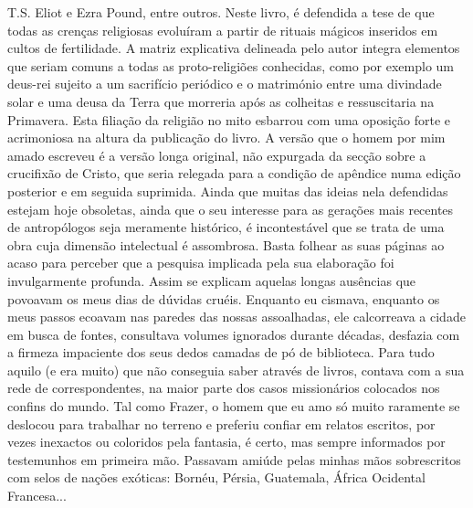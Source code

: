 T.S. Eliot e Ezra Pound, entre outros. Neste livro, é defendida a tese
de que todas as crenças religiosas evoluíram a partir de rituais mágicos
inseridos em cultos de fertilidade. A matriz explicativa delineada pelo
autor integra elementos que seriam comuns a todas as proto-religiões
conhecidas, como por exemplo um deus-rei sujeito a um sacrifício
periódico e o matrimónio entre uma divindade solar e uma deusa da Terra
que morreria após as colheitas e ressuscitaria na Primavera. Esta
filiação da religião no mito esbarrou com uma oposição forte e
acrimoniosa na altura da publicação do livro. A versão que o homem por
mim amado escreveu é a versão longa original, não expurgada da secção
sobre a crucifixão de Cristo, que seria relegada para a condição de
apêndice numa edição posterior e em seguida suprimida. Ainda que muitas
das ideias nela defendidas estejam hoje obsoletas, ainda que o seu
interesse para as gerações mais recentes de antropólogos seja meramente
histórico, é incontestável que se trata de uma
obra cuja dimensão intelectual é assombrosa. Basta folhear as suas
páginas ao acaso para perceber que a pesquisa implicada pela sua
elaboração foi invulgarmente profunda. Assim se explicam aquelas
longas ausências que povoavam os meus dias de dúvidas cruéis. Enquanto
eu cismava, enquanto os meus passos ecoavam nas paredes das nossas
assoalhadas, ele calcorreava a cidade em busca de fontes, consultava
volumes ignorados durante décadas, desfazia com a firmeza impaciente dos
seus dedos camadas de pó de biblioteca. Para tudo aquilo (e era muito)
que não conseguia saber através de livros, contava com a sua rede de
correspondentes, na maior parte dos casos missionários colocados nos
confins do mundo. Tal como Frazer, o homem que eu amo só muito raramente
se deslocou para trabalhar no terreno e preferiu confiar em relatos
escritos, por vezes inexactos ou coloridos pela fantasia, é certo, mas
sempre informados por testemunhos em primeira mão. Passavam amiúde
pelas minhas mãos sobrescritos com selos de nações exóticas: Bornéu,
Pérsia, Guatemala, África Ocidental Francesa...

